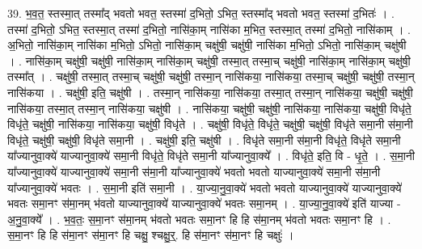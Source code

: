 \documentclass[17pt]{extarticle}
\begin{document}
39. भ॒व॒त॒ स्तस्मा॒त् तस्मा᳚द् भवतो भवत॒ स्तस्मा॑ द॒भितो॒ ऽभित॒ स्तस्मा᳚द् भवतो भवत॒ स्तस्मा॑ द॒भितः॑ । . तस्मा॑ द॒भितो॒ ऽभित॒ स्तस्मा॒त् तस्मा॑ द॒भितो॒ नासि॑का॒म् नासि॑का म॒भित॒ स्तस्मा॒त् तस्मा॑ द॒भितो॒ नासि॑काम् । . अ॒भितो॒ नासि॑का॒म् नासि॑का म॒भितो॒ ऽभितो॒ नासि॑का॒म् चक्षु॑षी॒ चक्षु॑षी॒ नासि॑का म॒भितो॒ ऽभितो॒ नासि॑का॒म् चक्षु॑षी । . नासि॑का॒म् चक्षु॑षी॒ चक्षु॑षी॒ नासि॑का॒म् नासि॑का॒म् चक्षु॑षी॒ तस्मा॒त् तस्मा॒च् चक्षु॑षी॒ नासि॑का॒म् नासि॑का॒म् चक्षु॑षी॒ तस्मा᳚त् । . चक्षु॑षी॒ तस्मा॒त् तस्मा॒च् चक्षु॑षी॒ चक्षु॑षी॒ तस्मा॒न् नासि॑कया॒ नासि॑कया॒ तस्मा॒च् चक्षु॑षी॒ चक्षु॑षी॒ तस्मा॒न् नासि॑कया । . चक्षु॑षी॒ इति॒ चक्षु॑षी । . तस्मा॒न् नासि॑कया॒ नासि॑कया॒ तस्मा॒त् तस्मा॒न् नासि॑कया॒ चक्षु॑षी॒ चक्षु॑षी॒ नासि॑कया॒ तस्मा॒त् तस्मा॒न् नासि॑कया॒ चक्षु॑षी । . नासि॑कया॒ चक्षु॑षी॒ चक्षु॑षी॒ नासि॑कया॒ नासि॑कया॒ चक्षु॑षी॒ विधृ॑ते॒ विधृ॑ते॒ चक्षु॑षी॒ नासि॑कया॒ नासि॑कया॒ चक्षु॑षी॒ विधृ॑ते । . चक्षु॑षी॒ विधृ॑ते॒ विधृ॑ते॒ चक्षु॑षी॒ चक्षु॑षी॒ विधृ॑ते समा॒नी स॑मा॒नी विधृ॑ते॒ चक्षु॑षी॒ चक्षु॑षी॒ विधृ॑ते समा॒नी । . चक्षु॑षी॒ इति॒ चक्षु॑षी । . विधृ॑ते समा॒नी स॑मा॒नी विधृ॑ते॒ विधृ॑ते समा॒नी या᳚ज्यानुवा॒क्ये॑ याज्यानुवा॒क्ये॑ समा॒नी विधृ॑ते॒ विधृ॑ते समा॒नी या᳚ज्यानुवा॒क्ये᳚ । . विधृ॑ते॒ इति॒ वि - धृ॒ते॒ । . स॒मा॒नी या᳚ज्यानुवा॒क्ये॑ याज्यानुवा॒क्ये॑ समा॒नी स॑मा॒नी या᳚ज्यानुवा॒क्ये॑ भवतो भवतो याज्यानुवा॒क्ये॑ समा॒नी स॑मा॒नी या᳚ज्यानुवा॒क्ये॑ भवतः । . स॒मा॒नी इति॑ समा॒नी । . या॒ज्या॒नु॒वा॒क्ये॑ भवतो भवतो याज्यानुवा॒क्ये॑ याज्यानुवा॒क्ये॑ भवतः समा॒नꣳ स॑मा॒नम् भ॑वतो याज्यानुवा॒क्ये॑ याज्यानुवा॒क्ये॑ भवतः समा॒नम् । . या॒ज्या॒नु॒वा॒क्ये॑ इति॑ याज्या - अ॒नु॒वा॒क्ये᳚ । . भ॒व॒तः॒ स॒मा॒नꣳ स॑मा॒नम् भ॑वतो भवतः समा॒नꣳ हि हि स॑मा॒नम् भ॑वतो भवतः समा॒नꣳ हि । . स॒मा॒नꣳ हि हि स॑मा॒नꣳ स॑मा॒नꣳ हि चक्षु॒ श्चक्षु॒र्॒. हि स॑मा॒नꣳ स॑मा॒नꣳ हि चक्षुः॑ । \newline
\end{document}
